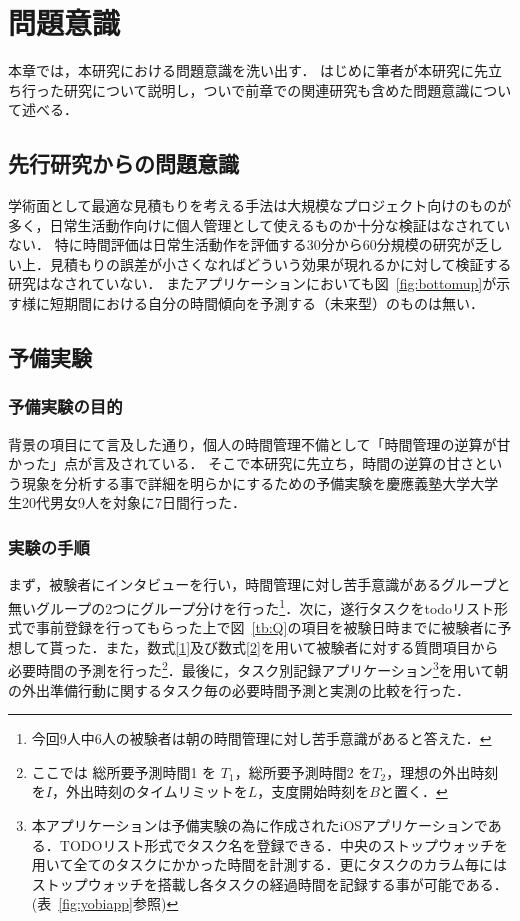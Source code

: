 \chapter{問題意識}
本章では，本研究における問題意識を洗い出す．
はじめに筆者が本研究に先立ち行った研究について説明し，ついで前章での関連研究も含めた問題意識について述べる．

\section{先行研究からの問題意識}
学術面として最適な見積もりを考える手法は大規模なプロジェクト向けのものが多く，日常生活動作向けに個人管理として使えるものか十分な検証はなされていない．
特に時間評価は日常生活動作を評価する30分から60分規模の研究が乏しい上．見積もりの誤差が小さくなればどういう効果が現れるかに対して検証する研究はなされていない．
またアプリケーションにおいても図~\ref{fig:bottomup}が示す様に短期間における自分の時間傾向を予測する（未来型）のものは無い．

\section{予備実験}
\subsection{予備実験の目的}
背景の項目にて言及した通り，個人の時間管理不備として「時間管理の逆算が甘かった」点が言及されている．
そこで本研究に先立ち，時間の逆算の甘さという現象を分析する事で詳細を明らかにするための予備実験を慶應義塾大学大学生20代男女9人を対象に7日間行った．
\subsection{実験の手順}
まず，被験者にインタビューを行い，時間管理に対し苦手意識があるグループと無いグループの2つにグループ分けを行った\footnote{今回9人中6人の被験者は朝の時間管理に対し苦手意識があると答えた．}．次に，遂行タスクをtodoリスト形式で事前登録を行ってもらった上で図~\ref{tb:Q}の項目を被験日時までに被験者に予想して貰った．また，数式\ref{1}及び数式\ref{2}を用いて被験者に対する質問項目から必要時間の予測を行った\footnote{ここでは 総所要予測時間1 を $T_{1}$，総所要予測時間2 を$T_{2}$，理想の外出時刻を$I$，外出時刻のタイムリミットを$L$，支度開始時刻を$B$と置く．}．最後に，タスク別記録アプリケーション\footnote{本アプリケーションは予備実験の為に作成されたiOSアプリケーションである．TODOリスト形式でタスク名を登録できる．中央のストップウォッチを用いて全てのタスクにかかった時間を計測する．更にタスクのカラム毎にはストップウォッチを搭載し各タスクの経過時間を記録する事が可能である．(表~\ref{fig:yobiapp}参照)}を用いて朝の外出準備行動に関するタスク毎の必要時間予測と実測の比較を行った．

